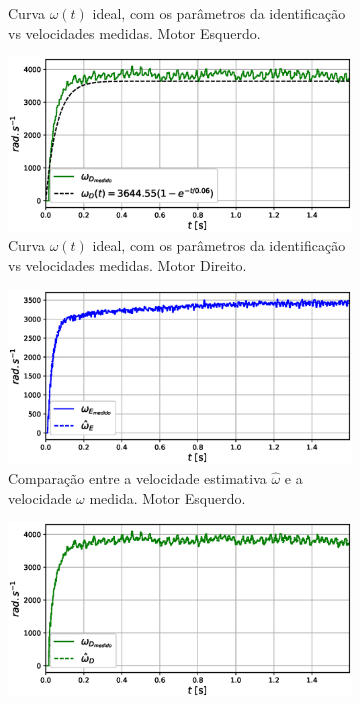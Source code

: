 \begin{figure}[H]
\begin{subfigure}{.5\textwidth}
    \caption{Curva $\omega(t)$ ideal, com os parâmetros da identificação vs velocidades medidas. Motor Esquerdo.}
    \label{fig:exp04:regressao_medido_esquerdo}
    \end{subfigure}
    \hfill
    \begin{subfigure}{.5\textwidth}
    \centering
    \includegraphics[width=\textwidth]{figuras/resultados/exp04/regressao_vs_medido_direito100.eps}
    \caption{Curva $\omega(t)$ ideal, com os parâmetros da identificação vs velocidades medidas. Motor Direito.}
    \label{fig:exp04:regressao_medido_direito}
    \end{subfigure}
    \hfill
    \begin{subfigure}{.5\textwidth}
    \centering
    \includegraphics[width=\textwidth]{figuras/resultados/exp04/filtro_vs_sem_filtro_esquerdo100.eps}
    \caption{Comparação entre a velocidade estimativa $\hat{\omega}$ e a velocidade $\omega$ medida. Motor Esquerdo.}
    \label{fig:exp04:filtragem_esquerdo}
    \end{subfigure}
    \hfill
    \begin{subfigure}{.5\textwidth}
    \centering
    \includegraphics[width=\textwidth]{figuras/resultados/exp04/filtro_vs_sem_filtro_direito100.eps}

\end{subfigure}
\end{figure}
